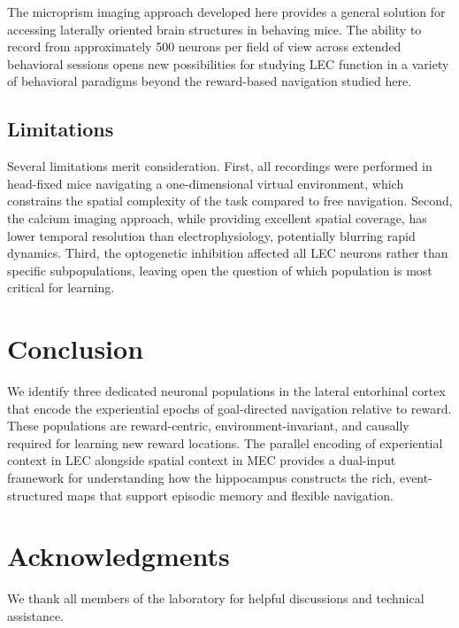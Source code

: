 \documentclass[12pt]{article}
\begin{document}
The microprism imaging approach developed here provides a general solution for accessing laterally oriented brain structures in behaving mice. The ability to record from approximately 500 neurons per field of view across extended behavioral sessions opens new possibilities for studying LEC function in a variety of behavioral paradigms beyond the reward-based navigation studied here.

\subsection{Limitations}

Several limitations merit consideration. First, all recordings were performed in head-fixed mice navigating a one-dimensional virtual environment, which constrains the spatial complexity of the task compared to free navigation. Second, the calcium imaging approach, while providing excellent spatial coverage, has lower temporal resolution than electrophysiology, potentially blurring rapid dynamics. Third, the optogenetic inhibition affected all LEC neurons rather than specific subpopulations, leaving open the question of which population is most critical for learning.

\section{Conclusion}

We identify three dedicated neuronal populations in the lateral entorhinal cortex that encode the experiential epochs of goal-directed navigation relative to reward. These populations are reward-centric, environment-invariant, and causally required for learning new reward locations. The parallel encoding of experiential context in LEC alongside spatial context in MEC provides a dual-input framework for understanding how the hippocampus constructs the rich, event-structured maps that support episodic memory and flexible navigation.

\section*{Acknowledgments}
We thank all members of the laboratory for helpful discussions and technical assistance.



\end{document}
